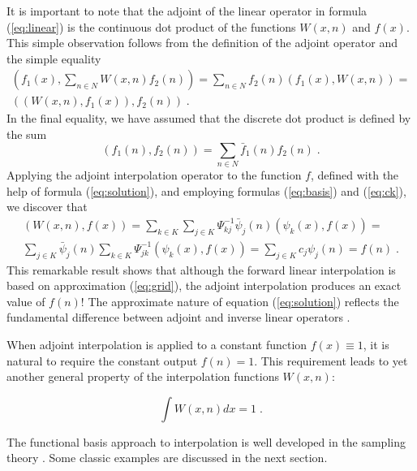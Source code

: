 It is important to note that the adjoint of the linear operator in
formula (\ref{eq:linear}) is the continuous dot product of the
functions $W (x, n)$ and $f (x)$. This simple observation follows from
the definition of the adjoint operator and the simple equality
\begin{eqnarray}\label{eq:dottest}
 \left(f_1 (x), \sum_{n \in N} W (x, n) f_2 (n)\right) = \sum_{n
 \in N} f_2 (n) \left(f_1 (x), W (x, n) \right) = \nonumber \\
 \left(\left(W (x, n), f_1 (x)\right), f_2 (n) \right) \;.
\end{eqnarray}
In the final equality, we have assumed that the discrete dot product
is defined by the sum
\begin{equation}\label{eq:ddot}
  (f_1 (n), f_2 (n)) = \sum_{n \in N} \bar{f}_1 (n) f_2 (n) \;.
\end{equation}
Applying the adjoint interpolation operator to the function $f$,
defined with the help of formula (\ref{eq:solution}), and employing
formulas (\ref{eq:basis}) and (\ref{eq:ck}), we discover that
\begin{eqnarray}\label{eq:adjoint}
 \left(W (x, n), f (x)\right) = \sum_{k \in K} \sum_{j \in K}
 \Psi^{-1}_{kj} \bar{\psi}_j (n) \left(\psi_k (x), f (x)\right) =
 \nonumber \\ \sum_{j \in K} \bar{\psi}_j (n) \sum_{k \in K}
 \Psi^{-1}_{jk} \left(\psi_k (x), f (x)\right) = \sum_{j \in K} c_j
 \psi_j (n) = f (n)\;.
\end{eqnarray}
This remarkable result shows that although the forward linear
interpolation is based on approximation (\ref{eq:grid}), the adjoint
interpolation produces an exact value of $f (n)$! The approximate
nature of equation (\ref{eq:solution}) reflects the fundamental
difference between adjoint and inverse linear operators
\cite[]{Claerbout.blackwell.92}. 

When adjoint interpolation is applied to a constant function $f (x)
\equiv 1$, it is natural to require the constant output $f (n) = 1$.
This requirement leads to yet another general property of the
interpolation functions $W (x,n)$:
\begin{property}
\begin{equation}\label{eq:intwdx}
\int W (x, n) dx = 1\;.
\end{equation}
\end{property}

The functional basis approach to interpolation is well developed in
the sampling theory \cite[]{garcia}. Some classic examples are discussed
in the next section.


